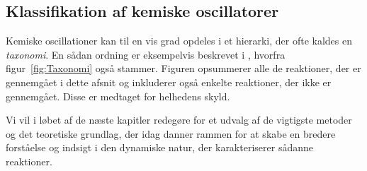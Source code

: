 \subsection{Klassifikation af kemiske oscillatorer}
Kemiske oscillationer kan til en vis grad opdeles i et
hierarki, der ofte kaldes en {\em taxonomi\/}. En s{\aa}dan
ordning er eksempelvis beskrevet i \cite{Taxonomy}, hvorfra
figur~\ref{fig:Taxonomi} ogs{\aa} stammer. Figuren
opsummerer alle de reaktioner, der er gennemg{\aa}et i
dette afsnit og inkluderer ogs{\aa} enkelte reaktioner, der
ikke er gennemg{\aa}et. Disse er medtaget for helhedens
skyld.

\vspace{4.0mm}
Vi vil i l{\o}bet af de n{\ae}ste kapitler redeg{\o}re for
et udvalg af de vigtigste metoder og det teoretiske
grundlag, der idag danner rammen for at skabe en bredere
forst{\aa}else og indsigt i den dynamiske natur, der
karakteriserer s{\aa}danne reaktioner.

